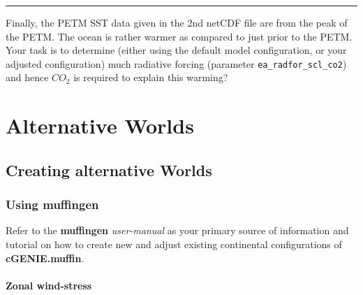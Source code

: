 \documentclass[11pt,fleqn]{book} %
\begin{document}
\vspace{1mm}
\noindent\rule{4cm}{0.1mm}
\vspace{2mm}

\noindent Finally, the PETM SST data given in the 2nd netCDF file are from the peak of the PETM. The ocean is rather warmer as compared to just prior to the PETM. Your task is to determine (either using the default model configuration, or your adjusted configuration) much radiative forcing (parameter \texttt{ea\_radfor\_scl\_co2}) and hence \(CO_{2}\) is required to explain this warming? 


\cleardoublepage


\chapter{Alternative Worlds}

\hfill \break


\newpage


\section{Creating alternative Worlds}


\subsection{Using muffingen}

Refer to the \textbf{muffingen} \textit{user-manual} as your primary source of information and tutorial on how to create new and adjust existing continental configurations of \textbf{cGENIE.muffin}.


\subsubsection{Zonal wind-stress}
\end{document}

